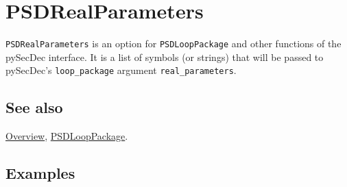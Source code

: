 \documentclass[../FeynHelpersManual.tex]{subfiles}
\begin{document}
\hypertarget{psdrealparameters}{
\section{PSDRealParameters}\label{psdrealparameters}}

\texttt{PSDRealParameters} is an option for \texttt{PSDLoopPackage} and
other functions of the pySecDec interface. It is a list of symbols (or
strings) that will be passed to pySecDec's \texttt{loop_package}
argument \texttt{real_parameters}.

\subsection{See also}

\hyperlink{toc}{Overview}, \hyperlink{psdlooppackage}{PSDLoopPackage}.

\subsection{Examples}
\end{document}
